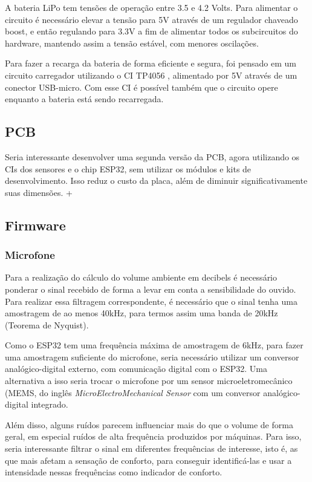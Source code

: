 \documentclass[../monografia.tex]{subfiles}
\begin{document}
A bateria LiPo tem tensões de operação entre 3.5 e 4.2 Volts. Para alimentar o circuito é necessário elevar a tensão para 5V através de um regulador chaveado boost, e então regulando para 3.3V a fim de alimentar todos os subcircuitos do hardware, mantendo assim a tensão estável, com menores oscilações. 

Para fazer a recarga da bateria de forma eficiente e segura, foi pensado em um circuito carregador utilizando o CI TP4056 \cite{tp4056}, alimentado por 5V através de um conector USB-micro. Com esse CI é possível também que o circuito opere enquanto a bateria está sendo recarregada. 

\subsection{PCB}

Seria interessante desenvolver uma segunda versão da PCB, agora utilizando os CIs dos sensores e o chip ESP32, sem utilizar os módulos e kits de desenvolvimento. Isso reduz o custo da placa, além de diminuir significativamente suas dimensões. +


\subsection{Firmware}
\subsubsection{Microfone}

Para a realização do cálculo do volume ambiente em decibels é necessário ponderar o sinal recebido de forma a levar em conta a sensibilidade do ouvido. Para realizar essa filtragem correspondente, é necessário que o sinal tenha uma amostragem de ao menos 40kHz, para termos assim uma banda de 20kHz (Teorema de Nyquist). 

Como o ESP32 tem uma frequência máxima de amostragem de 6kHz, para fazer uma amostragem suficiente do microfone, seria necessário utilizar um conversor analógico-digital externo, com comunicação digital com o ESP32. Uma alternativa a isso seria trocar o microfone por um sensor microeletromecânico (MEMS, do inglês \textit{MicroElectroMechanical Sensor} com um conversor analógico-digital integrado. 

Além disso, alguns ruídos parecem influenciar mais do que o volume de forma geral, em especial ruídos de alta frequência produzidos por máquinas. Para isso, seria interessante filtrar o sinal em diferentes frequências de interesse, isto é, as que mais afetam a sensação de conforto, para conseguir identificá-las e usar a intensidade nessas frequências como indicador de conforto. 
\end{document}
